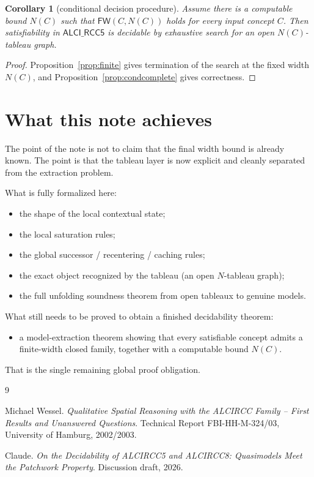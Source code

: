 \documentclass[11pt]{article}
\newtheorem{corollary}[theorem]{Corollary}
\theoremstyle{definition}
\newcommand{\ALCIRCC}{\mathsf{ALCI\_RCC5}}
\begin{document}
\begin{corollary}[conditional decision procedure]
Assume there is a computable bound $N(C)$ such that $\mathsf{FW}(C,N(C))$ holds for every input concept $C$. Then satisfiability in $\ALCIRCC$ is decidable by exhaustive search for an open $N(C)$-tableau graph.
\end{corollary}

\begin{proof}
Proposition~\ref{prop:finite} gives termination of the search at the fixed width $N(C)$, and Proposition~\ref{prop:condcomplete} gives correctness.
\end{proof}

\section{What this note achieves}

The point of the note is not to claim that the final width bound is already known. The point is that the tableau layer is now explicit and cleanly separated from the extraction problem.

What is fully formalized here:
\begin{itemize}
    \item the shape of the local contextual state;
    \item the local saturation rules;
    \item the global successor / recentering / caching rules;
    \item the exact object recognized by the tableau (an open $N$-tableau graph);
    \item the full unfolding soundness theorem from open tableaux to genuine models.
\end{itemize}

What still needs to be proved to obtain a finished decidability theorem:
\begin{itemize}
    \item a model-extraction theorem showing that every satisfiable concept admits a finite-width closed family, together with a computable bound $N(C)$.
\end{itemize}

That is the single remaining global proof obligation.

\begin{thebibliography}{9}

Michael Wessel.
\newblock \emph{Qualitative Spatial Reasoning with the ALCIRCC Family -- First Results and Unanswered Questions}.
\newblock Technical Report FBI-HH-M-324/03, University of Hamburg, 2002/2003.

Claude.
\newblock \emph{On the Decidability of ALCIRCC5 and ALCIRCC8: Quasimodels Meet the Patchwork Property}.
\newblock Discussion draft, 2026.

\end{thebibliography}
\end{document}
